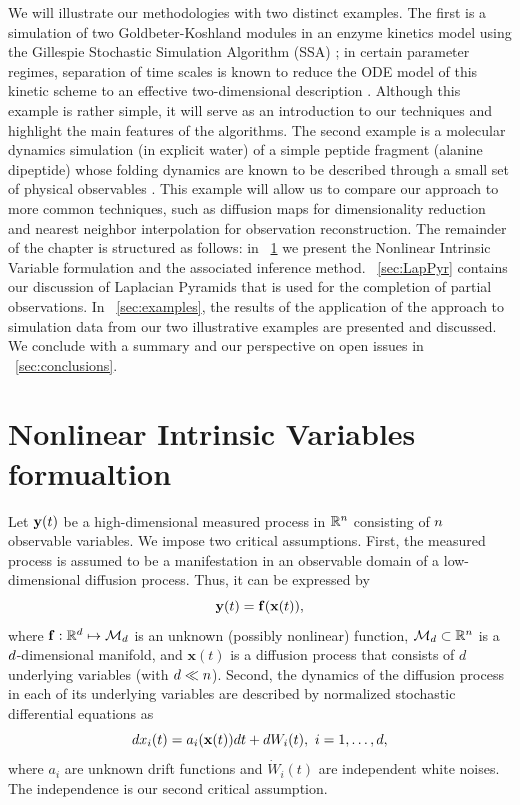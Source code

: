 We will illustrate our methodologies with two distinct examples.
%
The first is a simulation
of two Goldbeter-Koshland modules in an enzyme kinetics model using the Gillespie Stochastic Simulation
Algorithm (SSA) \cite{gillespie1977exact};
in certain parameter regimes, separation of time scales is known
to reduce the ODE model of this kinetic scheme to an effective two-dimensional description \cite{zagaris2012stability}.
%
Although this example is rather simple, it will serve as an introduction to our techniques and highlight the main features of the algorithms.
%
The second example is a molecular dynamics
simulation (in explicit water) of a simple peptide fragment (alanine dipeptide) whose folding
dynamics are known to be described through a small set of physical observables \cite{bolhuis2000reaction}.
%
This example will allow us to compare our approach to more common techniques,
such as diffusion maps \cite{coifman2005geometric} for dimensionality reduction
and nearest neighbor interpolation for observation reconstruction.
%
The remainder of the chapter is structured as follows: in \sec~\ref{sec:NIV} we present the Nonlinear Intrinsic Variable formulation and
the associated inference method.
%
\sec~\ref{sec:LapPyr} contains our discussion of Laplacian Pyramids that
is used for the completion of partial observations.
%
In \sec~\ref{sec:examples}, the results
of the application of the approach to simulation data from our two illustrative examples are presented and discussed.
%
We conclude with a summary and our perspective on open issues in \sec~\ref{sec:conclusions}.

\section{Nonlinear Intrinsic Variables formualtion} \label{sec:NIV}

Let $\mathbf{y}(t)$ be a high-dimensional measured process in $\mathbb{R}^n$ consisting of $n$ observable variables.
%
We impose two critical assumptions. First, the measured process is assumed to be a manifestation in an observable domain of a low-dimensional diffusion process. Thus, it can be expressed by
\begin{equation}
	\mathbf{y}(t) = \mathbf{f}(\mathbf{x}(t)),
\end{equation}
where $\mathbf{f}:\mathbb{R}^d \mapsto \mathcal{M}_d$ is an unknown (possibly nonlinear) function, $\mathcal{M}_d \subset \mathbb{R}^n$ is a $d$-dimensional manifold,
and $\mathbf{x}(t)$ is a diffusion process that consists of $d$ underlying variables (with $d \ll n$).
%
Second, the dynamics of the diffusion process in each of its underlying variables are described by normalized stochastic differential equations as
\begin{equation}
	d x_i(t) = a_i (\mathbf{x}(t)) dt + d W_i(t), \ i=1,\ldots,d,
	\label{eq:dynamics}
\end{equation}
where $a_i$ are unknown drift functions and $\dot{W}_i(t)$ are independent white noises.
%
The independence is our second critical assumption.

